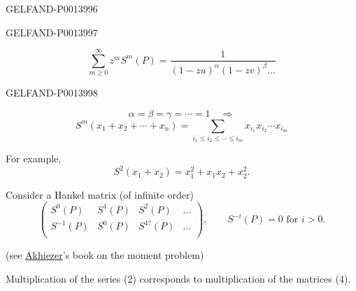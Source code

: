 \begin{GelfandAdjacentEvidence}{GELFAND-P001399}{6}

\end{GelfandAdjacentEvidence}
\begin{GelfandAdjacentEvidence}{GELFAND-P001399}{7}

\begin{equation*}
\sum_{m\ge 0}^{\infty}z^m S^m(P)
=\frac{1}{(1-zu)^\alpha(1-zv)^\beta\ldots} \tag{2}
\end{equation*}
\end{GelfandAdjacentEvidence}
\begin{GelfandAdjacentEvidence}{GELFAND-P001399}{8}


\[
\alpha=\beta=\gamma=\cdots=1\quad\Rightarrow
\]
\begin{equation*}
S^m(x_1+x_2+\cdots+x_n)
=\sum_{i_1\le i_2\le\cdots\le i_m}x_{i_1}x_{i_2}\cdots x_{i_m} \tag{3}
\end{equation*}

For example,
\[
S^2(x_1+x_2)=x_1^2+x_1x_2+x_2^2.
\]

Consider a Hankel matrix (of infinite order)
\begin{equation*}
\begin{pmatrix}
S^0(P)&S^1(P)&S^2(P)&\ldots\\
S^{-1}(P)&S^0(P)&S^{4?}(P)&\ldots\\
&&&
\end{pmatrix},\qquad S^{-i}(P)=0\text{ for }i>0. \tag{4}
\end{equation*}
\end{GelfandAdjacentEvidence}


(see \uline{Akhiezer}'s book on the moment problem)

Multiplication of the series (2) corresponds to multiplication of the matrices (4).



